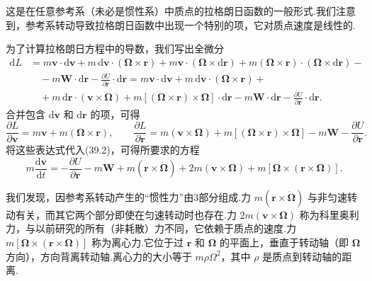 这是在任意参考系（未必是惯性系）中质点的拉格朗日函数的一般形式.我们注意到，参考系转动导致拉格朗日函数中出现一个特别的项，它对质点速度是线性的.

为了计算拉格朗日方程中的导数，我们写出全微分
\begin{equation*}
\begin{aligned}
  \mathrm{d}L&=m\boldsymbol{v}\cdot\mathrm{d}\boldsymbol{v}
  +m\,\mathrm{d}\boldsymbol{v}\cdot(\boldsymbol{\Omega}\times\boldsymbol{r})
  +m\boldsymbol{v}\cdot(\boldsymbol{\Omega}\times\mathrm{d}\boldsymbol{r})
  +m\left(\boldsymbol{\Omega}\times\boldsymbol{r}\right)\cdot
  \left(\boldsymbol{\Omega}\times\mathrm{d}\boldsymbol{r}\right)-\\
  &\quad-m\boldsymbol{W}\cdot\mathrm{d}\boldsymbol{r}
  -\frac{\partial U}{\partial\boldsymbol{r}}\cdot\mathrm{d}\boldsymbol{r}
  =m\boldsymbol{v}\cdot\mathrm{d}\boldsymbol{v}
  +m\,\mathrm{d}\boldsymbol{v}\cdot(\boldsymbol{\Omega}\times\boldsymbol{r})+\\
  &\quad+m\,\mathrm{d}\boldsymbol{r}\cdot(\boldsymbol{v}\times\boldsymbol{\Omega})
  +m\left[\left(\boldsymbol{\Omega}\times\boldsymbol{r}\right)\times
  \boldsymbol{\Omega}\right]\cdot\mathrm{d}\boldsymbol{r}
  -m\boldsymbol{W}\cdot\mathrm{d}\boldsymbol{r}
  -\frac{\partial U}{\partial\boldsymbol{r}}\cdot\mathrm{d}\boldsymbol{r}.
\end{aligned}
\end{equation*}
合并包含 $\mathrm{d}\boldsymbol{v}$ 和 $\mathrm{d}\boldsymbol{r}$ 的项，可得
\begin{equation*}
  \frac{\partial L}{\partial\boldsymbol{v}}
  =m\boldsymbol{v}+m\left(\boldsymbol{\Omega}\times\boldsymbol{r}\right),
  \qquad
  \frac{\partial L}{\partial\boldsymbol{r}}
  =m\left(\boldsymbol{v}\times\boldsymbol{\Omega}\right)
  +m\left[\left(\boldsymbol{\Omega}\times\boldsymbol{r}\right)\times
  \boldsymbol{\Omega}\right]
  -m\boldsymbol{W}
  -\frac{\partial U}{\partial\boldsymbol{r}}.
\end{equation*}
将这些表达式代入(39.2)，可得所要求的方程
\begin{equation}
  m\frac{\mathrm{d}\boldsymbol{v}}{\mathrm{d}t}
  =-\frac{\partial U}{\partial\boldsymbol{r}}
  -m\boldsymbol{W}
  +m\left(\boldsymbol{r}\times\dot{\boldsymbol{\Omega}}\right)
  +2m\left(\boldsymbol{v}\times\boldsymbol{\Omega}\right)
  +m\left[\boldsymbol{\Omega}\times\left(\boldsymbol{r}\times\boldsymbol{\Omega}\right)\right].
\end{equation}

我们发现，因参考系转动产生的“惯性力”由3部分组成.力
$m\left(\boldsymbol{r}\times\dot{\boldsymbol{\Omega}}\right)$
与非匀速转动有关，而其它两个部分即使在匀速转动时也存在.力
$2m\left(\boldsymbol{v}\times\boldsymbol{\Omega}\right)$
称为科里奥利力，与以前研究的所有（非耗散）力不同，它依赖于质点的速度.力
$m\left[\boldsymbol{\Omega}\times\left(\boldsymbol{r}\times\boldsymbol{\Omega}\right)\right]$
称为离心力.它位于过 $\boldsymbol{r}$ 和 $\boldsymbol{\Omega}$ 的平面上，垂直于转动轴（即 $\boldsymbol{\Omega}$ 方向），方向背离转动轴.离心力的大小等于 $m\rho\Omega^2$，其中 $\rho$ 是质点到转动轴的距离.

